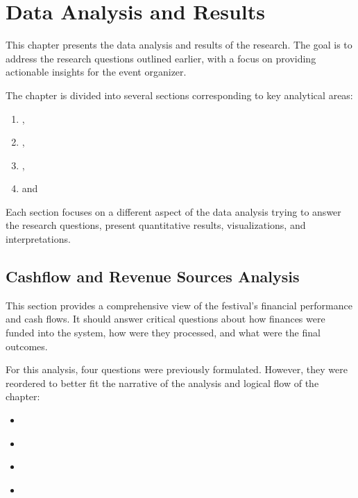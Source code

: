 \chapter{Data Analysis and Results}
\label{ch:data-analysis-and-results}

This chapter presents the data analysis and results of the research.
The goal is to address the research questions outlined earlier, with a focus on providing actionable insights for the event organizer.

The chapter is divided into several sections corresponding to key analytical areas:
\begin{enumerate}
	\item {},
	\item {},
	\item {},
	\item and~
\end{enumerate}

Each section focuses on a different aspect of the data analysis trying to answer the research questions, present quantitative results, visualizations, and interpretations.



\section{Cashflow and Revenue Sources Analysis}
\label{sec:analysis-cashflow-and-revenue-sources}

This section provides a comprehensive view of the festival's financial performance and cash flows.
It should answer critical questions about how finances were funded into the system, how were they processed, and what were the final outcomes.

For this analysis, four questions were previously formulated.
However, they were reordered to better fit the narrative of the analysis and logical flow of the chapter:
\begin{itemize}
	\item \textit{}
	\item \textit{}
	\item \textit{}
	\item \textit{}
\end{itemize}


